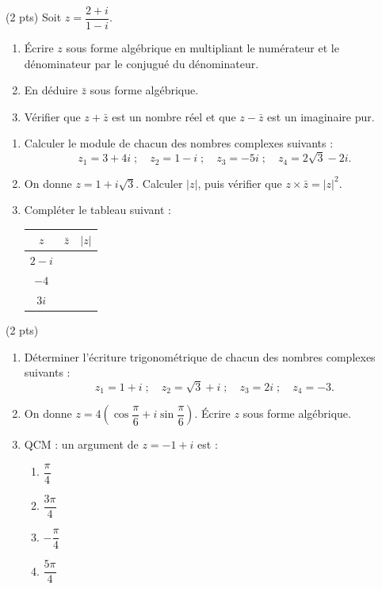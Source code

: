 \documentclass[11pt]{article}
\begin{document}
\begin{exercice} \hfill (2 pts)
Soit $z = \dfrac{2 + i}{1 - i}$.
\begin{enumerate}
\item Écrire $z$ sous forme algébrique en multipliant le numérateur et le dénominateur par le conjugué du dénominateur.
\item En déduire $\bar{z}$ sous forme algébrique.
\item Vérifier que $z + \bar{z}$ est un nombre réel et que $z - \bar{z}$ est un imaginaire pur.
\end{enumerate}
\end{exercice}

\begin{exercice}
\begin{enumerate}
\item Calculer le module de chacun des nombres complexes suivants :
\[ z_1 = 3 + 4i \;;\quad z_2 = 1 - i \;;\quad z_3 = -5i \;;\quad z_4 = 2\sqrt{3} - 2i. \]
\item On donne $z = 1 + i\sqrt{3}$. Calculer $|z|$, puis vérifier que $z \times \bar{z} = |z|^2$.
\item Compléter le tableau suivant :
\begin{center}
\begin{tabular}{|c|c|c|}
\hline
$z$ & $\bar{z}$ & $|z|$ \\
\hline
$2 - i$ & & \\
\hline
$-4$ & & \\
\hline
$3i$ & & \\
\hline
\end{tabular}
\end{center}
\end{enumerate}
\end{exercice}

\begin{exercice} \hfill (2 pts)
\begin{enumerate}
\item Déterminer l'écriture trigonométrique de chacun des nombres complexes suivants :
\[ z_1 = 1 + i \;;\quad z_2 = \sqrt{3} + i \;;\quad z_3 = 2i \;;\quad z_4 = -3. \]
\item On donne $z = 4\left(\cos\dfrac{\pi}{6} + i\sin\dfrac{\pi}{6}\right)$. Écrire $z$ sous forme algébrique.
\item QCM : un argument de $z = -1 + i$ est :
\begin{enumerate}
\item $\dfrac{\pi}{4}$ \qquad \item $\dfrac{3\pi}{4}$ \qquad \item $-\dfrac{\pi}{4}$ \qquad \item $\dfrac{5\pi}{4}$
\end{enumerate}
\end{enumerate}
\end{exercice}
\end{document}
